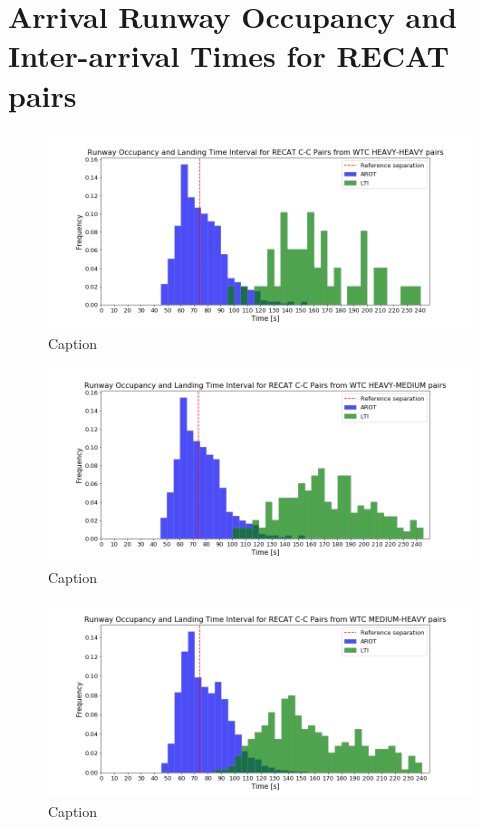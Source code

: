 \section{Arrival Runway Occupancy and Inter-arrival Times for RECAT pairs}




\begin{figure}
    \centering
    \includegraphics[width=1\textwidth]{graphics/fig_CC_from_HH_pairs_time_sep.png}
    \caption[list of figures caption]{Caption}
    \label{fig:CC_from_HH_pairs_time_sep}
\end{figure}




\begin{figure}
    \centering
    \includegraphics[width=1\textwidth]{graphics/fig_CC_from_HM_pairs_time_sep.png}
    \caption[list of figures caption]{Caption}
    \label{fig:CC_from_HM_pairs_time_sep}
\end{figure}

\begin{figure}
    \centering
    \includegraphics[width=1\textwidth]{graphics/fig_CC_from_MH_pairs_time_sep.png}
    \caption[list of figures caption]{Caption}
    \label{fig:CC_from_MH_pairs_time_sep}
\end{figure}

